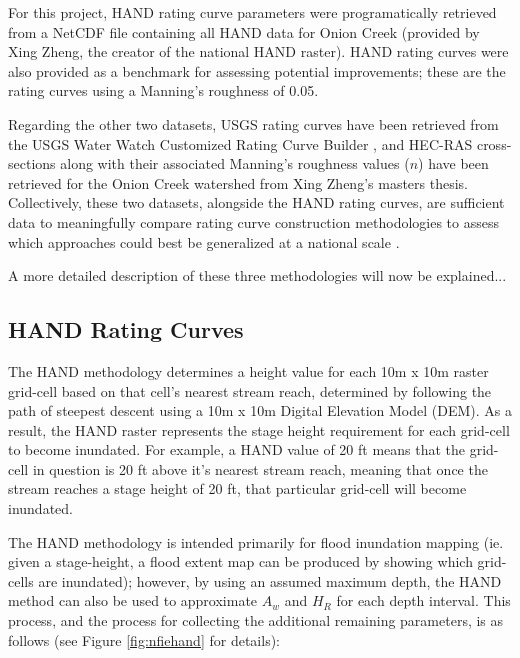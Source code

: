 \documentclass[12pt]{article}
\begin{document}
For this project, HAND rating curve parameters were programatically retrieved from a NetCDF file containing all HAND data for Onion Creek (provided by Xing Zheng, the creator of the national HAND raster). HAND rating curves were also provided as a benchmark for assessing potential improvements; these are the rating curves using a Manning's roughness of 0.05. 

Regarding the other two datasets, USGS rating curves have been retrieved from the USGS Water Watch Customized Rating Curve Builder \cite{usgswaterwatch}, and HEC-RAS cross-sections along with their associated Manning's roughness values ($n$) have been retrieved for the Onion Creek watershed from Xing Zheng's masters thesis. Collectively, these two datasets, alongside the HAND rating curves, are sufficient data to meaningfully compare rating curve construction methodologies to assess which approaches could best be generalized at a national scale \cite{xingms}. 

A more detailed description of these three methodologies will now be explained... 

\subsection*{HAND Rating Curves}

The HAND methodology determines a height value for each 10m x 10m raster grid-cell based on that cell's nearest stream reach, determined by following the path of steepest descent using a 10m x 10m Digital Elevation Model (DEM). As a result, the HAND raster represents the stage height requirement for each grid-cell to become inundated. For example, a HAND value of 20 ft means that the grid-cell in question is 20 ft above it's nearest stream reach, meaning that once the stream reaches a stage height of 20 ft, that particular grid-cell will become inundated. 

The HAND methodology is intended primarily for flood inundation mapping (ie. given a stage-height, a flood extent map can be produced by showing which grid-cells are inundated); however, by using an assumed maximum depth, the HAND method can also be used to approximate $A_w$ and $H_R$ for each depth interval. This process, and the process for collecting the additional remaining parameters, is as follows (see Figure \ref{fig:nfiehand} for details): 

\end{document}
